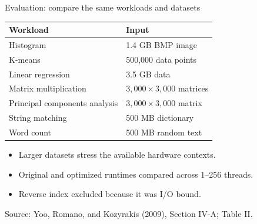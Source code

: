 \documentclass[aspectratio=169,11pt]{beamer}
\newcommand{\src}[1]{\vfill{\tiny\color{gray}Source: Yoo, Romano, and Kozyrakis (2009), #1.}}
\begin{document}
\begin{frame}{Evaluation: compare the same workloads and datasets}
\small
\begin{tabular}{ll}
\toprule Workload & Input\\\midrule
Histogram & 1.4 GB BMP image\\
K-means & 500,000 data points\\
Linear regression & 3.5 GB data\\
Matrix multiplication & $3{,}000\times3{,}000$ matrices\\
Principal components analysis & $3{,}000\times3{,}000$ matrix\\
String matching & 500 MB dictionary\\
Word count & 500 MB random text\\\bottomrule
\end{tabular}
\vspace{.3cm}
\begin{itemize}
\item Larger datasets stress the available hardware contexts.
\item Original and optimized runtimes compared across 1--256 threads.
\item Reverse index excluded because it was I/O bound.
\end{itemize}
\src{Section IV-A; Table II}
\end{frame}
\end{document}

